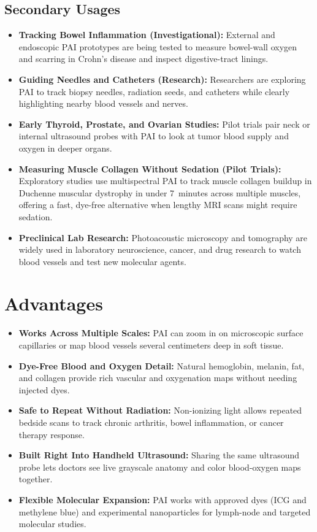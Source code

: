 \subsection{Secondary Usages}
\begin{itemize}
  \item \textbf{Tracking Bowel Inflammation (Investigational):} External and endoscopic PAI prototypes are being tested to measure bowel-wall oxygen and scarring in Crohn's disease and inspect digestive-tract linings.
  \item \textbf{Guiding Needles and Catheters (Research):} Researchers are exploring PAI to track biopsy needles, radiation seeds, and catheters while clearly highlighting nearby blood vessels and nerves.
  \item \textbf{Early Thyroid, Prostate, and Ovarian Studies:} Pilot trials pair neck or internal ultrasound probes with PAI to look at tumor blood supply and oxygen in deeper organs.
  \item \textbf{Measuring Muscle Collagen Without Sedation (Pilot Trials):} Exploratory studies use multispectral PAI to track muscle collagen buildup in Duchenne muscular dystrophy in under 7~minutes across multiple muscles, offering a fast, dye-free alternative when lengthy MRI scans might require sedation.
  \item \textbf{Preclinical Lab Research:} Photoacoustic microscopy and tomography are widely used in laboratory neuroscience, cancer, and drug research to watch blood vessels and test new molecular agents.
\end{itemize}

\section{Advantages}
\begin{itemize}
  \item \textbf{Works Across Multiple Scales:} PAI can zoom in on microscopic surface capillaries or map blood vessels several centimeters deep in soft tissue.
  \item \textbf{Dye-Free Blood and Oxygen Detail:} Natural hemoglobin, melanin, fat, and collagen provide rich vascular and oxygenation maps without needing injected dyes.
  \item \textbf{Safe to Repeat Without Radiation:} Non-ionizing light allows repeated bedside scans to track chronic arthritis, bowel inflammation, or cancer therapy response.
  \item \textbf{Built Right Into Handheld Ultrasound:} Sharing the same ultrasound probe lets doctors see live grayscale anatomy and color blood-oxygen maps together.
  \item \textbf{Flexible Molecular Expansion:} PAI works with approved dyes (ICG and methylene blue) and experimental nanoparticles for lymph-node and targeted molecular studies.
\end{itemize}

